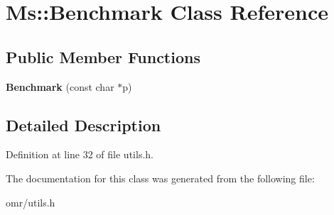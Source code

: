 \hypertarget{class_ms_1_1_benchmark}{}\section{Ms\+:\+:Benchmark Class Reference}
\label{class_ms_1_1_benchmark}
\subsection*{Public Member Functions}
\begin{DoxyCompactItemize}
\item 
\mbox{\label{class_ms_1_1_benchmark_af6de604951cf544f4f22c7a9c2a36bc2}} 
{\bfseries Benchmark} (const char $\ast$p)
\end{DoxyCompactItemize}


\subsection{Detailed Description}


Definition at line 32 of file utils.\+h.



The documentation for this class was generated from the following file\+:\begin{DoxyCompactItemize}
\item 
omr/utils.\+h\end{DoxyCompactItemize}
